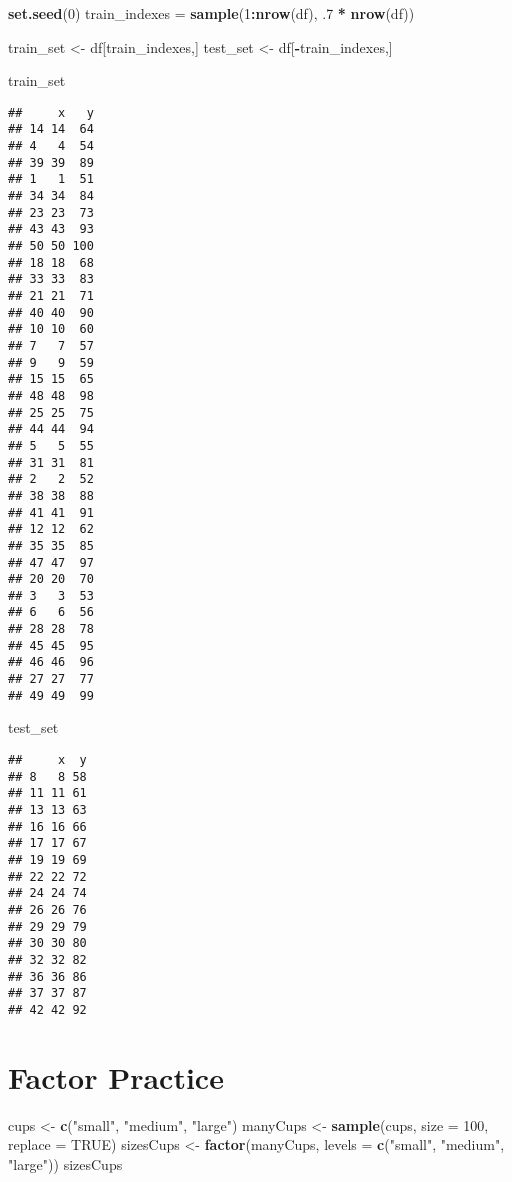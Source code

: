\documentclass[]{book}
\newenvironment{Shaded}{\begin{snugshade}}{\end{snugshade}}
\newcommand{\DataTypeTok}[1]{\textcolor[rgb]{0.13,0.29,0.53}{#1}}
\newcommand{\DecValTok}[1]{\textcolor[rgb]{0.00,0.00,0.81}{#1}}
\newcommand{\FloatTok}[1]{\textcolor[rgb]{0.00,0.00,0.81}{#1}}
\newcommand{\KeywordTok}[1]{\textcolor[rgb]{0.13,0.29,0.53}{\textbf{#1}}}
\newcommand{\NormalTok}[1]{#1}
\newcommand{\OperatorTok}[1]{\textcolor[rgb]{0.81,0.36,0.00}{\textbf{#1}}}
\newcommand{\OtherTok}[1]{\textcolor[rgb]{0.56,0.35,0.01}{#1}}
\newcommand{\StringTok}[1]{\textcolor[rgb]{0.31,0.60,0.02}{#1}}
\begin{document}
\begin{Shaded}
\begin{Highlighting}[]
\KeywordTok{set.seed}\NormalTok{(}\DecValTok{0}\NormalTok{)}
\NormalTok{train_indexes =}\StringTok{ }\KeywordTok{sample}\NormalTok{(}\DecValTok{1}\OperatorTok{:}\KeywordTok{nrow}\NormalTok{(df), }\FloatTok{.7} \OperatorTok{*}\StringTok{ }\KeywordTok{nrow}\NormalTok{(df))}

\NormalTok{train_set <-}\StringTok{ }\NormalTok{df[train_indexes,]}
\NormalTok{test_set <-}\StringTok{ }\NormalTok{df[}\OperatorTok{-}\NormalTok{train_indexes,]}

\NormalTok{train_set}
\end{Highlighting}
\end{Shaded}

\begin{verbatim}
##     x   y
## 14 14  64
## 4   4  54
## 39 39  89
## 1   1  51
## 34 34  84
## 23 23  73
## 43 43  93
## 50 50 100
## 18 18  68
## 33 33  83
## 21 21  71
## 40 40  90
## 10 10  60
## 7   7  57
## 9   9  59
## 15 15  65
## 48 48  98
## 25 25  75
## 44 44  94
## 5   5  55
## 31 31  81
## 2   2  52
## 38 38  88
## 41 41  91
## 12 12  62
## 35 35  85
## 47 47  97
## 20 20  70
## 3   3  53
## 6   6  56
## 28 28  78
## 45 45  95
## 46 46  96
## 27 27  77
## 49 49  99
\end{verbatim}

\begin{Shaded}
\begin{Highlighting}[]
\NormalTok{test_set}
\end{Highlighting}
\end{Shaded}

\begin{verbatim}
##     x  y
## 8   8 58
## 11 11 61
## 13 13 63
## 16 16 66
## 17 17 67
## 19 19 69
## 22 22 72
## 24 24 74
## 26 26 76
## 29 29 79
## 30 30 80
## 32 32 82
## 36 36 86
## 37 37 87
## 42 42 92
\end{verbatim}

\hypertarget{factor-practice}{%
\chapter{Factor Practice}\label{factor-practice}}

\begin{Shaded}
\begin{Highlighting}[]
\NormalTok{cups <-}\StringTok{ }\KeywordTok{c}\NormalTok{(}\StringTok{"small"}\NormalTok{, }\StringTok{"medium"}\NormalTok{, }\StringTok{"large"}\NormalTok{)}
\NormalTok{manyCups <-}\StringTok{ }\KeywordTok{sample}\NormalTok{(cups, }\DataTypeTok{size =} \DecValTok{100}\NormalTok{, }\DataTypeTok{replace =} \OtherTok{TRUE}\NormalTok{)}
\NormalTok{sizesCups <-}\StringTok{ }\KeywordTok{factor}\NormalTok{(manyCups, }\DataTypeTok{levels =} \KeywordTok{c}\NormalTok{(}\StringTok{"small"}\NormalTok{, }\StringTok{"medium"}\NormalTok{, }\StringTok{"large"}\NormalTok{))}
\NormalTok{sizesCups}
\end{Highlighting}
\end{Shaded}
\end{document}
